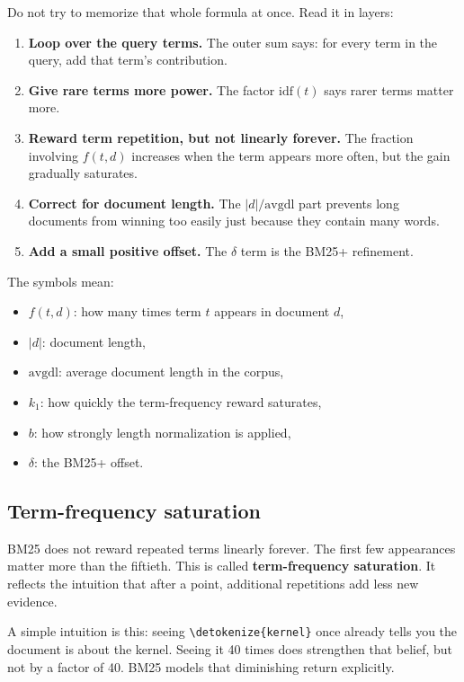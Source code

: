 \documentclass[10pt]{article}
\DeclareRobustCommand{\code}[1]{%
  \ifmmode
    \text{\nolinkurl{\detokenize{#1}}}%
  \else
    \nolinkurl{\detokenize{#1}}%
  \fi
}
\begin{document}
Do not try to memorize that whole formula at once. Read it in layers:
\begin{enumerate}
    \item \textbf{Loop over the query terms.} The outer sum says: for every term in the query, add that term's contribution.
    \item \textbf{Give rare terms more power.} The factor \(\mathrm{idf}(t)\) says rarer terms matter more.
    \item \textbf{Reward term repetition, but not linearly forever.} The fraction involving \(f(t,d)\) increases when the term appears more often, but the gain gradually saturates.
    \item \textbf{Correct for document length.} The \(|d|/\mathrm{avgdl}\) part prevents long documents from winning too easily just because they contain many words.
    \item \textbf{Add a small positive offset.} The \(\delta\) term is the BM25+ refinement.
\end{enumerate}

The symbols mean:
\begin{itemize}
    \item \(f(t,d)\): how many times term \(t\) appears in document \(d\),
    \item \(|d|\): document length,
    \item \(\mathrm{avgdl}\): average document length in the corpus,
    \item \(k_1\): how quickly the term-frequency reward saturates,
    \item \(b\): how strongly length normalization is applied,
    \item \(\delta\): the BM25+ offset.
\end{itemize}

\subsection{Term-frequency saturation}

BM25 does not reward repeated terms linearly forever. The first few appearances matter more than the fiftieth. This is called \textbf{term-frequency saturation}. It reflects the intuition that after a point, additional repetitions add less new evidence.

A simple intuition is this: seeing \code{kernel} once already tells you the document is about the kernel. Seeing it 40 times does strengthen that belief, but not by a factor of 40. BM25 models that diminishing return explicitly.
\end{document}
